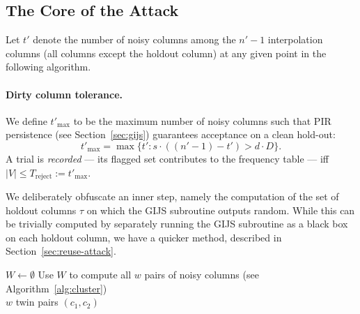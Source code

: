\subsection{The Core of the Attack}\label{sec:fullattack}
Let $t'$ denote the number
of noisy columns among the $n'-1$ interpolation columns (all columns except the
holdout column) at any given point in the following algorithm.

\paragraph{Dirty column tolerance.}
We define $t'_{\max}$ to be the maximum number of noisy columns such that PIR
persistence (see Section~\ref{sec:gijs}) guarantees acceptance on a clean
hold-out:
\begin{equation}\label{eq:tmax}
    t'_{\max} = \max\{t' : s\cdot((n'-1) - t') > d\cdot D\}.
\end{equation}
A trial is \emph{recorded} --- its flagged set contributes to the
frequency table --- iff $|V| \leq T_{\mathrm{reject}} := t'_{\max}$.

We deliberately obfuscate an inner step, namely the computation of the set of 
holdout columns $\tau$ on which the GIJS subroutine outputs random. 
While this can be trivially computed by separately running the GIJS subroutine 
as a black box on each holdout column, we have a quicker method, described in 
Section~\ref{sec:reuse-attack}.

\medskip

\begin{algorithm}[H]
    \caption{Phase 1}
    \label{alg:main_analysis}

    $W \leftarrow \emptyset$\;
    Use $W$ to compute all $w$ pairs of noisy columns (see Algorithm~\ref{alg:cluster})\\
    \Return $w$ twin pairs $(c_1, c_2)$
\end{algorithm}


